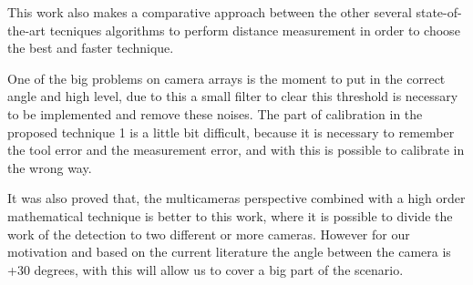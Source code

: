 This work also makes a comparative approach between the other several state-of-the-art tecniques algorithms to perform distance measurement in order to choose the best and faster technique. 

One of the big problems on camera arrays is the moment to put in the correct angle and high level, due to this a small filter to clear this threshold is necessary to be implemented and remove these noises. The part of calibration in the proposed technique 1 is a little bit difficult, because it is necessary to remember the tool error and the measurement error, and with this is possible to calibrate in the wrong way. 

It was also proved that, the multicameras perspective combined with a high order mathematical technique is better to this work, where it is possible to divide the work of the detection to two different or more cameras. However for our motivation and based on the current literature the angle between the camera is +30 degrees, with this will allow us to cover a big part of the scenario.   